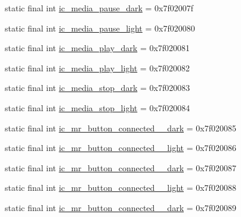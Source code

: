 \begin{CompactItemize}
\item 
static final int \hyperlink{classandroid_1_1support_1_1graphics_1_1drawable_1_1animated_1_1_r_1_1drawable_53efb0ace85aaab0568db6aaf85e58be}{ic\_\-media\_\-pause\_\-dark} = 0x7f02007f
\item 
static final int \hyperlink{classandroid_1_1support_1_1graphics_1_1drawable_1_1animated_1_1_r_1_1drawable_3c1557cea97fed3ffcf4fb36ccc241b5}{ic\_\-media\_\-pause\_\-light} = 0x7f020080
\item 
static final int \hyperlink{classandroid_1_1support_1_1graphics_1_1drawable_1_1animated_1_1_r_1_1drawable_e4da07a24fcad37462a27ec06e243e66}{ic\_\-media\_\-play\_\-dark} = 0x7f020081
\item 
static final int \hyperlink{classandroid_1_1support_1_1graphics_1_1drawable_1_1animated_1_1_r_1_1drawable_1439ac2a5498981ff28cdeea921d4b03}{ic\_\-media\_\-play\_\-light} = 0x7f020082
\item 
static final int \hyperlink{classandroid_1_1support_1_1graphics_1_1drawable_1_1animated_1_1_r_1_1drawable_5f5ec88ef250bf703a2120fb9d57874b}{ic\_\-media\_\-stop\_\-dark} = 0x7f020083
\item 
static final int \hyperlink{classandroid_1_1support_1_1graphics_1_1drawable_1_1animated_1_1_r_1_1drawable_325547b10ac040d082a114329c1a2878}{ic\_\-media\_\-stop\_\-light} = 0x7f020084
\item 
static final int \hyperlink{classandroid_1_1support_1_1graphics_1_1drawable_1_1animated_1_1_r_1_1drawable_cac0ddfc310e8a814ecefbcbf4fb46cd}{ic\_\-mr\_\-button\_\-connected\_\_\-dark} = 0x7f020085
\item 
static final int \hyperlink{classandroid_1_1support_1_1graphics_1_1drawable_1_1animated_1_1_r_1_1drawable_8197480f14c29571fcaf434d7cbce752}{ic\_\-mr\_\-button\_\-connected\_\_\-light} = 0x7f020086
\item 
static final int \hyperlink{classandroid_1_1support_1_1graphics_1_1drawable_1_1animated_1_1_r_1_1drawable_e42e805e37e03d5b33f73c30811a7878}{ic\_\-mr\_\-button\_\-connected\_\_\-dark} = 0x7f020087
\item 
static final int \hyperlink{classandroid_1_1support_1_1graphics_1_1drawable_1_1animated_1_1_r_1_1drawable_60833085bab3e7fb888c886791b4fe93}{ic\_\-mr\_\-button\_\-connected\_\_\-light} = 0x7f020088
\item 
static final int \hyperlink{classandroid_1_1support_1_1graphics_1_1drawable_1_1animated_1_1_r_1_1drawable_623df1d8946a682e2c83211fdcd0f3bb}{ic\_\-mr\_\-button\_\-connected\_\_\-dark} = 0x7f020089

\end{CompactItemize}

